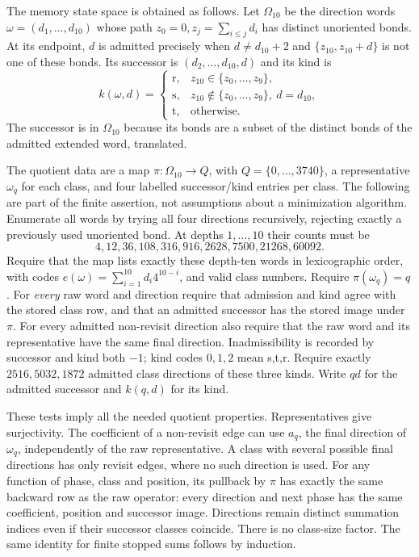 The memory state space is obtained as follows.  Let $\Omega_{10}$ be
the direction words $\omega=(d_1,\ldots,d_{10})$ whose path
$z_0=0,z_j=\sum_{i\le j}d_i$ has distinct unoriented bonds.
At its endpoint, $d$ is admitted precisely when $d\ne d_{10}+2$
and $\{z_{10},z_{10}+d\}$ is not one of these bonds.  Its successor
is $(d_2,\ldots,d_{10},d)$ and its kind is
\[
 k(\omega,d)=\begin{cases}
 \mathrm r,&z_{10}\in\{z_0,\ldots,z_9\},\\
 \mathrm s,&z_{10}\notin\{z_0,\ldots,z_9\},\ d=d_{10},\\
 \mathrm t,&\text{otherwise}.
 \end{cases}
\]
The successor is in $\Omega_{10}$ because its bonds are a subset
of the distinct bonds of the admitted extended word, translated.

The quotient data are a map $\pi:\Omega_{10}\to Q$, with
$Q=\{0,\ldots,3740\}$, a representative $\omega_q$ for each
class, and four labelled successor/kind entries per class.
The following are part of the finite assertion, not assumptions
about a minimization algorithm.  Enumerate all words by trying all
four directions recursively, rejecting exactly a previously used
unoriented bond.  At depths $1,\ldots,10$ their counts must be
\begin{equation}\label{hl:windowcounts}
 4,12,36,108,316,916,2628,7500,21268,60092.
\end{equation}
Require that the map lists exactly these depth-ten words in
lexicographic order, with codes
$e(\omega)=\sum_{i=1}^{10}d_i4^{10-i}$, and valid class numbers.
Require $\pi(\omega_q)=q$.  For \emph{every} raw word and direction
require that admission and kind agree with the stored class row,
and that an admitted successor has the stored image under $\pi$.
For every admitted non-revisit direction also require that the raw
word and its representative have the same final direction.
Inadmissibility is recorded by successor and kind both $-1$;
kind codes $0,1,2$ mean s,t,r.  Require exactly $2516,5032,1872$
admitted class directions of these three kinds.  Write $q d$ for
the admitted successor and $k(q,d)$ for its kind.

These tests imply all the needed quotient properties.  Representatives
give surjectivity.  The coefficient of a non-revisit edge can use
$a_q$, the final direction of $\omega_q$, independently of the
raw representative.  A class with several possible final directions
has only revisit edges, where no such direction is used.  For any
function of phase, class and position, its pullback by $\pi$ has
exactly the same backward row as the raw operator: every direction
and next phase has the same coefficient, position and successor
image.  Directions remain distinct summation indices even if
their successor classes coincide.  There is no class-size factor.
The same identity for finite stopped sums follows by induction.

